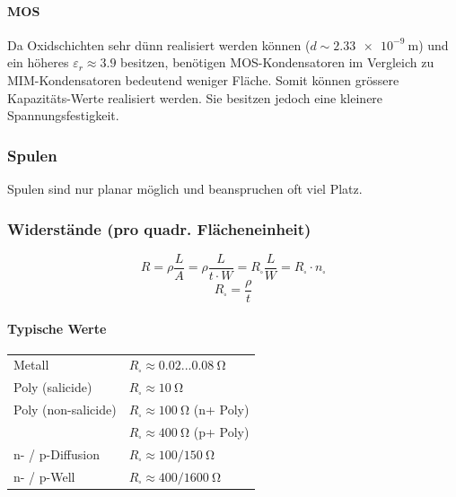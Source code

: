 \paragraph{MOS}
Da Oxidschichten sehr dünn realisiert werden können ($d \sim \qty{2.33e-9}{\meter}$) und ein höheres $\varepsilon_r \approx 3.9$ besitzen, benötigen MOS-Kondensatoren im Vergleich zu MIM-Kondensatoren bedeutend weniger Fläche.
Somit können grössere Kapazitäts-Werte realisiert werden.
Sie besitzen jedoch eine kleinere Spannungsfestigkeit.


\subsubsection{Spulen}
Spulen sind nur planar möglich und beanspruchen oft viel Platz.


\subsubsection{Widerstände (pro quadr. Flächeneinheit)}

\begin{minipage}[c]{0.48\columnwidth}
    $$ \boxed{ R = \rho \frac{L}{A} = \rho \frac{L}{t \cdot W} = R_\square \frac{L}{W} = R_\square \cdot n_\square } $$
    $$ \boxed{ R_\square = \frac{\rho}{t} } $$
\end{minipage}
\hfill
\begin{minipage}[c]{0.5\columnwidth}
    \paragraph{Typische Werte}

    \begin{tabular}{@{}l l@{}}
        Metall              & $R_\square \approx 0.02 ... \qty{0.08}{\ohm}$                  \\
        Poly (salicide)     & $R_\square \approx \qty{10}{\ohm}$                             \\
        Poly (non-salicide) & $R_\square \approx \qty{100}{\ohm}$ (n+ Poly)                  \\
                            & $R_\square \approx \qty{400}{\ohm}$ (p+ Poly)                  \\
        n- / p-Diffusion    & $R_\square \approx 100/\qty{150}{\ohm}$                        \\
        n- / p-Well         & $R_\square \approx 400/\qty{1600}{\ohm}$                       \\
    \end{tabular}
\end{minipage}


